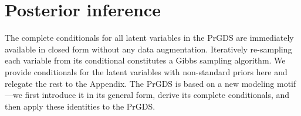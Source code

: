 \documentclass{article}
\begin{document}














\section{Posterior inference}
\label{sec:mcmc}
The complete conditionals for all latent variables in the PrGDS are immediately available in closed form without any data augmentation. Iteratively re-sampling each variable from its conditional constitutes a Gibbs sampling algorithm. We provide conditionals for the latent variables with non-standard priors here and relegate the rest to the Appendix. The PrGDS is based on a new modeling motif---we first introduce it in its general form, derive its complete conditionals, and then apply these identities to the PrGDS.~
\end{document}
